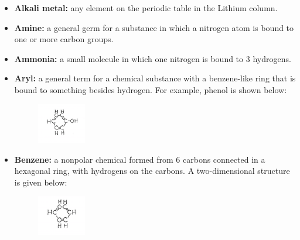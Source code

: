 \documentclass[11pt]{memoir}
\begin{document}
\begin{itemize}
\item[]{\textbf{Alkali metal:} any element on the periodic table in the Lithium column.}

\item[]{\textbf{Amine:} a general germ for a substance in which a nitrogen atom is bound to one or more carbon groups.}

\item[]{\textbf{Ammonia:} a small molecule in which one nitrogen is bound to 3 hydrogens.}

\item[]{\textbf{Aryl:} a general term for a chemical substance with a benzene-like ring that is bound to something besides hydrogen.  For example, phenol is shown below:}

\begin{figure}[h]
\vspace{-15pt}
\begin{center}
\includegraphics[width=0.2\textwidth]{images/lewis_notefig3.png}
\end{center}
\vspace{-30pt}
\end{figure}


\item[]{\textbf{Benzene:} a nonpolar chemical formed from 6 carbons connected in a hexagonal ring, with hydrogens on the carbons.  A two-dimensional structure is given below:}

\begin{figure}[h]
\vspace{-15pt}
\begin{center}
\includegraphics[width=0.2\textwidth]{images/lewis_notefig4.png}
\end{center}
\vspace{-30pt}
\end{figure}



\end{itemize}
\end{document}
